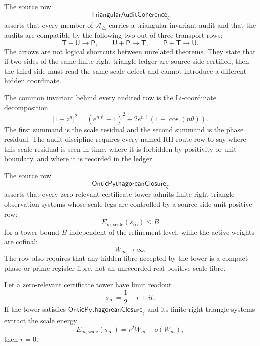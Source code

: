 \begin{definition}
\label{def:rh-triangular-audit-coherence}
The source row
$$
\mathsf{TriangularAuditCoherence}_{\zeta}
$$
asserts that every member of $\mathcal A_{\triangle}$ carries a
triangular invariant audit and that the audits are compatible by the
following two-out-of-three transport rows:
$$
\mathsf T+\mathsf U\to\mathsf P,
\qquad
\mathsf U+\mathsf P\to\mathsf T,
\qquad
\mathsf P+\mathsf T\to\mathsf U.
$$
The arrows are not logical shortcuts between unrelated theorems.  They
state that if two sides of the same finite right-triangle ledger are
source-side certified, then the third side must read the same scale
defect and cannot introduce a different hidden coordinate.
\end{definition}

\begin{principle}
\label{prin:rh-common-audit-invariant}
The common invariant behind every audited row is the Li-coordinate
decomposition
$$
|1-z^n|^2
=
(e^{n\ell}-1)^2+
2e^{n\ell}(1-\cos(n\theta)).
$$
The first summand is the scale residual and the second summand is the
phase residual.  The audit discipline requires every named RH-route row
to say where this scale residual is seen in time, where it is forbidden
by positivity or unit boundary, and where it is recorded in the ledger.
\end{principle}

\begin{definition}
\label{def:rh-ontic-pythagorean-closure-row}
The source row
$$
\mathsf{OnticPythagoreanClosure}_{\zeta}
$$
asserts that every zero-relevant certificate tower admits finite
right-triangle observation systems whose scale legs are controlled by a
source-side unit-positive row:
$$
E_{m,\mathrm{scale}}(s_\infty)\le B
$$
for a tower bound $B$ independent of the refinement level, while the
active weights are cofinal:
$$
W_m\to\infty.
$$
The row also requires that any hidden fibre accepted by the tower is a
compact phase or prime-register fibre, not an unrecorded real-positive
scale fibre.
\end{definition}

\begin{theorem}
\label{thm:rh-ontic-pythagorean-closure-fixed-half-readout}
Let a zero-relevant certificate tower have limit readout
$$
s_\infty=\frac12+r+it.
$$
If the tower satisfies
$\mathsf{OnticPythagoreanClosure}_{\zeta}$ and its finite
right-triangle systems extract the scale energy
$$
E_{m,\mathrm{scale}}(s_\infty)=r^2W_m+o(W_m),
$$
then $r=0$.
\end{theorem}

